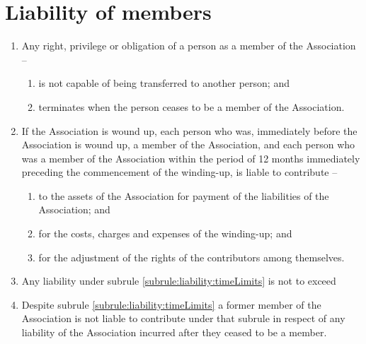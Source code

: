 \section{Liability of members}
\label{rule:liability}

\begin{enumerate}
	\item Any right, privilege or obligation of a person as a member of the Association --
	\begin{enumerate}
		\item is not capable of being transferred to another person; and
		\item terminates when the person ceases to be a member of the Association.
	\end{enumerate}
	
	\item \label{subrule:liability:timeLimits} If the Association is wound up, each person who was, immediately before the Association is wound up, a member of the Association, and each person who was a member of the Association within the period of 12 months immediately preceding the commencement of the winding-up, is liable to contribute --
	\begin{enumerate}
		\item to the assets of the Association for payment of the liabilities of the Association; and
		\item for the costs, charges and expenses of the winding-up; and
		\item for the adjustment of the rights of the contributors among themselves.
	\end{enumerate}
	
	\item Any liability under subrule \ref{subrule:liability:timeLimits} is not to exceed \orgLiabilityLimit{}
	\item Despite subrule \ref{subrule:liability:timeLimits} a former member of the Association is not liable to contribute under that subrule in respect of any liability of the Association incurred after they ceased to be a member.
	
\end{enumerate}